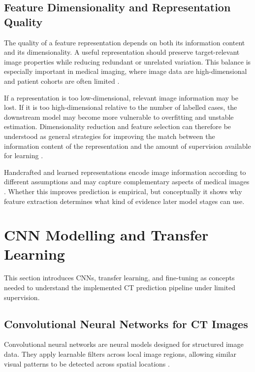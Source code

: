 \subsection{Feature Dimensionality and Representation Quality}
\label{sec:feature_dimensionality_representation_quality}

The quality of a feature representation depends on both its information content and its dimensionality. A useful representation should preserve target-relevant image properties while reducing redundant or unrelated variation. This balance is especially important in medical imaging, where image data are high-dimensional and patient cohorts are often limited \cite{mwangi2014feature,rizzo2018radiomics}.

If a representation is too low-dimensional, relevant image information may be lost. If it is too high-dimensional relative to the number of labelled cases, the downstream model may become more vulnerable to overfitting and unstable estimation. Dimensionality reduction and feature selection can therefore be understood as general strategies for improving the match between the information content of the representation and the amount of supervision available for learning \cite{mwangi2014feature}.

Handcrafted and learned representations encode image information according to different assumptions and may capture complementary aspects of medical images \cite{jeong2024handcrafteddeep,lai2018featurefusion}. Whether this improves prediction is empirical, but conceptually it shows why feature extraction determines what kind of evidence later model stages can use.



\section{CNN Modelling and Transfer Learning}
\label{sec:cnn_modelling_transfer_learning}

This section introduces CNNs, transfer learning, and fine-tuning as concepts needed to understand the implemented CT prediction pipeline under limited supervision.


\subsection{Convolutional Neural Networks for CT Images}
\label{sec:cnn_ct_images}

Convolutional neural networks are neural models designed for structured image data. They apply learnable filters across local image regions, allowing similar visual patterns to be detected across spatial locations \cite{lecun1998gradient,litjens2017survey}.

